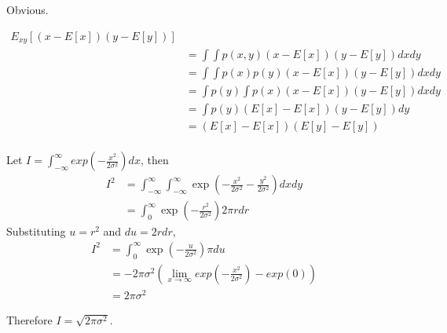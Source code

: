 \begin{problem}
  Obvious.
\end{problem}

\begin{problem}
  \begin{align*}
    E_{xy}\left[(x-E[x])(y-E[y])\right] \\
    ~~&= \int \int p(x, y) (x-E[x])(y-E[y]) dx dy \\
      &= \int \int p(x) p(y) (x-E[x])(y-E[y]) dx dy \\
      &= \int p(y) \int p(x) (x-E[x])(y-E[y]) dx dy \\
      &= \int p(y) (E[x]-E[x])(y-E[y]) dy \\
      &= (E[x]-E[x])(E[y]-E[y]) \\
  \end{align*}
\end{problem}

\begin{problem}
  Let $I = \int_{-\infty}^{\infty} exp\left(-\frac{x^2}{2\sigma^2}\right) dx$, then
  \begin{align*}
    I^2 &= \int_{-\infty}^{\infty} \int_{-\infty}^{\infty}
      \exp\left(-\frac{x^2}{2\sigma^2}-\frac{y^2}{2\sigma^2}\right) dx dy \\
        &= \int_{0}^{\infty} \exp\left(-\frac{r^2}{2\sigma^2}\right) 2\pi r dr
  \end{align*}
  Substituting $u=r^2$ and $du = 2 r dr$,
  \begin{align*}
    I^2 &= \int_{0}^{\infty} \exp\left(-\frac{u}{2\sigma^2}\right) \pi du \\
        &= -2 \pi \sigma^2 \left( \lim_{x\to\infty} exp\left(-\frac{x^2}{2\sigma^2}\right) -
                                  exp(0) \right) \\
        &= 2 \pi \sigma^2
  \end{align*}

  Therefore $I = \sqrt{2 \pi \sigma^2}$.
\end{problem}

